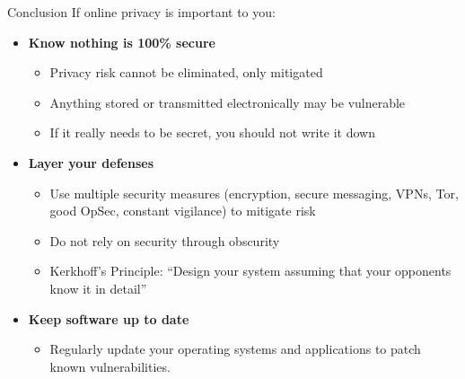 \documentclass[aspectratio=169]{beamer}
\renewcommand{\emph}[1]{{\color{magenta}#1}}
\begin{document}
\begin{frame}{Conclusion}
If online privacy is important to you:
  \begin{itemize}
    \item[] \textbf{Know \emph{nothing is 100\% secure}}
      \begin{itemize}
        \item Privacy risk cannot be eliminated, only mitigated
        \item Anything stored or transmitted electronically may be vulnerable
        \item If it really needs to be secret, \emph{you should not write it down}
      \end{itemize}
    \item[] \textbf{Layer your defenses}
      \begin{itemize}
        \item Use multiple security measures (encryption, secure messaging, VPNs, Tor, good OpSec, constant vigilance) to mitigate risk
        \item Do not rely on security through obscurity
        \item \emph{Kerkhoff's Principle}: ``Design your system assuming that your opponents know it in detail''
      \end{itemize}
    \item[] \textbf{Keep software up to date}
      \begin{itemize}
        \item Regularly update your operating systems and applications to patch known vulnerabilities.
      \end{itemize}
  \end{itemize}
\end{frame}
\end{document}
